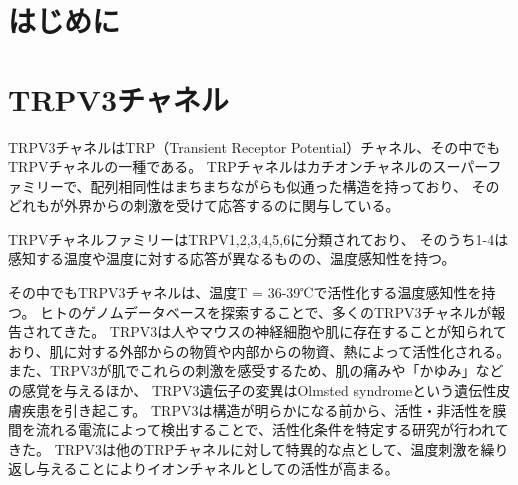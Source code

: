 
%
%
%
%

\section{はじめに}

\section{TRPV3チャネル}
TRPV3チャネルはTRP（Transient Receptor Potential）チャネル、その中でもTRPVチャネルの一種である。
TRPチャネルはカチオンチャネルのスーパーファミリーで、配列相同性はまちまちながらも似通った構造を持っており、
そのどれもが外界からの刺激を受けて応答するのに関与している。\autocite{venkatachalam_trp_2007}

TRPVチャネルファミリーはTRPV1,2,3,4,5,6に分類されており、
そのうち1-4は感知する温度や温度に対する応答が異なるものの、温度感知性を持つ。\autocite{baylie_trpv_2011}

その中でもTRPV3チャネルは、温度T = 36-39℃で活性化する温度感知性を持つ。\autocite{baylie_trpv_2011,xuTRPV3CalciumpermeableTemperaturesensitive2002}
ヒトのゲノムデータベースを探索することで、多くのTRPV3チャネルが報告されてきた。\autocite{smithTRPV3TemperaturesensitiveVanilloid2002, xuTRPV3CalciumpermeableTemperaturesensitive2002, peier_heat-sensitive_2002}
TRPV3は人やマウスの神経細胞や肌に存在することが知られており、肌に対する外部からの物質や内部からの物資、熱によって活性化される。%
また、TRPV3が肌でこれらの刺激を感受するため、肌の痛みや「かゆみ」などの感覚を与えるほか、
TRPV3遺伝子の変異はOlmsted syndromeという遺伝性皮膚疾患を引き起こす。\autocite{lin_exome_2012,lai-cheong_recurrent_2012,nilius_trpv_2013}
TRPV3は構造が明らかになる前から、活性・非活性を膜間を流れる電流によって検出することで、活性化条件を特定する研究が行われてきた。
\autocite{smithTRPV3TemperaturesensitiveVanilloid2002,xuTRPV3CalciumpermeableTemperaturesensitive2002,nadezhdinStructuralMechanismHeatinduced2021,chung_2-aminoethoxydiphenyl_2004}
TRPV3は他のTRPチャネルに対して特異的な点として、温度刺激を繰り返し与えることによりイオンチャネルとしての活性が高まる。
\autocite{peier_heat-sensitive_2002,chung_2-aminoethoxydiphenyl_2004,liu_hysteresis_2011}


